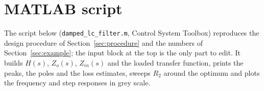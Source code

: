 \documentclass[11pt,a4paper]{article}
\begin{document}
\section{MATLAB script}
\label{app:matlab}

The script below (\texttt{damped\_lc\_filter.m}, Control System Toolbox) reproduces the
design procedure of Section~\ref{sec:procedure} and the numbers of
Section~\ref{sec:example}; the input block at the top is the only part to edit. It
builds $H(s)$, $Z_o(s)$, $Z_{in}(s)$ and the loaded transfer function, prints the
peaks, the poles and the loss estimates, sweeps $R_2$ around the optimum and plots the
frequency and step responses in grey scale.
\end{document}
